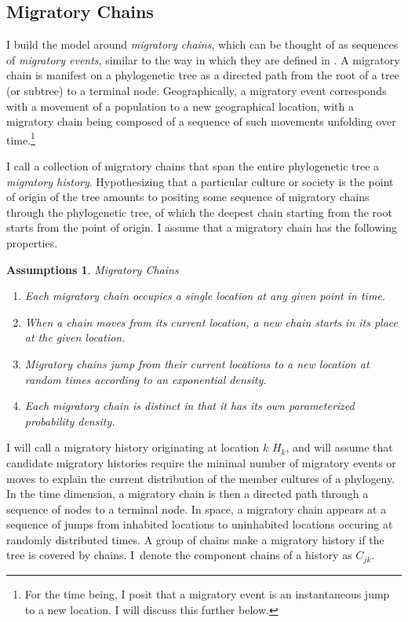 \documentclass[11pt]{article}
\newtheorem{assumptions}{Assumptions}
\begin{document}
\subsection{Migratory Chains}
 
I build the model around \textit{migratory chains}, which can be thought of as sequences of \textit{migratory events}, similar to the way in which they are defined in \cite{dyen56}. A migratory chain is manifest on a phylogenetic tree as a directed path from the root of a tree (or subtree) to a terminal node. Geographically, a migratory event corresponds with a movement of a population to a new geographical location, with a migratory chain being composed of a sequence of such movements unfolding over time.\footnote{For the time being, I posit that a migratory event is an instantaneous jump to a new location. I will discuss this further below.}

 I call a  collection of migratory chains that span the entire phylogenetic tree a \textit{migratory history}. Hypothesizing that a particular culture or society is the point of origin of the tree amounts to positing some sequence of migratory chains through the phylogenetic tree, of which the deepest chain starting from the root starts from the point of origin. I assume that a migratory chain has the following properties.

\begin{assumptions}{Migratory Chains}    
\begin{enumerate}
\item Each migratory chain occupies a single location at any given point in time.
\item When a chain moves from its current location, a new chain starts in its place at the given location.
\item Migratory chains jump from their current locations to a new location at random times according to an exponential density.
\item Each migratory chain is distinct in that it has its own parameterized probability density.
\end{enumerate}
\end{assumptions}
I will call a migratory history originating at location $k$ $H_k$, and will assume that candidate migratory histories require the minimal number of migratory events or moves to explain the current distribution of the member cultures of a phylogeny. In the time dimension, a migratory chain is then a directed path through a sequence of nodes to a terminal node. In space, a migratory chain appears at a sequence of jumps from inhabited locations to uninhabited locations occuring at randomly distributed times. A group of chains make a migratory history if the tree is covered by chains. I\ denote the component chains of a history as $C_{jk}$.
\end{document}
